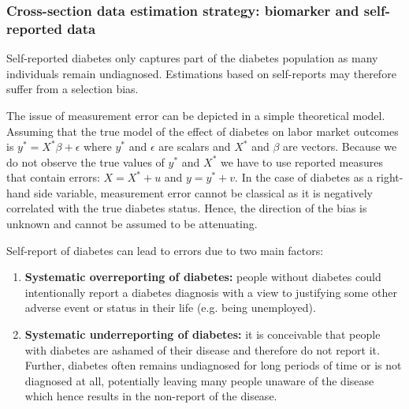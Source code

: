 \documentclass[12pt,english,british]{article}
\begin{document}
\subsubsection{Cross-section data estimation strategy: biomarker and self-reported data}

Self-reported diabetes only captures part of the diabetes population as many individuals remain undiagnosed.  Estimations based on self-reports may therefore suffer from a selection bias.

The issue of measurement error can be depicted in a simple theoretical model. Assuming that the true model of the effect of diabetes on labor market outcomes is $y^{*}=X^{*}\beta+\epsilon$ where $y^{*}$ and $\epsilon$ are scalars and $X^{*}$ and $\beta$ are vectors. Because we do not observe the true values of $y^{*}$ and $X^{*}$  we have to use reported measures that contain errors: $X=X^{*} + u$ and $y=y^{*} + v$. In the case of diabetes as a right-hand side variable, measurement error cannot be classical as it is negatively correlated with the true diabetes status. Hence, the direction of the bias is unknown and cannot be assumed to be attenuating.

Self-report of diabetes can lead to errors due to two main factors: 
\begin{enumerate}
\item \textbf{Systematic overreporting of diabetes:} people without diabetes
could intentionally report a diabetes diagnosis with a view to justifying
some other adverse event or status in their life (e.g. being unemployed). 
\item \textbf{Systematic underreporting of diabetes:} it is conceivable
that people with diabetes are ashamed of their disease and therefore
do not report it. Further, diabetes often remains
undiagnosed for long periods of time or is not diagnosed at all, potentially
leaving many people unaware of the disease which hence results in
the non-report of the disease.
\end{enumerate} 
\end{document}
